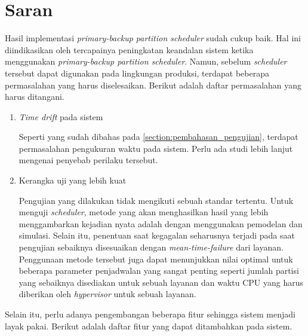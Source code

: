 \section{Saran}

Hasil implementasi \textit{primary-backup partition scheduler} sudah cukup baik. Hal ini
diindikasikan oleh tercapainya peningkatan keandalan sistem ketika menggunakan
\textit{primary-backup partition scheduler}. Namun, sebelum \textit{scheduler} tersebut dapat
digunakan pada lingkungan produksi, terdapat beberapa permasalahan yang harus diselesaikan.
Berikut adalah daftar permasalahan yang harus ditangani.

\begin{enumerate}

	\item \textit{Time drift} pada sistem

		Seperti yang sudah dibahas pada \autoref{section:pembahasan_pengujian}, terdapat
		permasalahan pengukuran waktu pada sistem. Perlu ada studi lebih lanjut mengenai
		penyebab perilaku tersebut.

	\item Kerangka uji yang lebih kuat

		Pengujian yang dilakukan tidak mengikuti sebuah standar tertentu. Untuk menguji
		\textit{scheduler}, metode yang akan menghasilkan hasil yang lebih menggambarkan
		kejadian nyata adalah dengan menggunakan pemodelan dan simulasi. Selain itu,
		penentuan saat kegagalan seharusnya terjadi pada saat pengujian sebaiknya
		disesuaikan dengan \textit{mean-time-failure} dari layanan. Penggunaan metode
		tersebut juga dapat menunjukkan nilai optimal untuk beberapa parameter
		penjadwalan yang sangat penting seperti jumlah partisi yang sebaiknya disediakan
		untuk sebuah layanan dan waktu CPU yang harus diberikan oleh \textit{hypervisor}
		untuk sebuah layanan.

\end{enumerate}

Selain itu, perlu adanya pengembangan beberapa fitur sehingga sistem menjadi layak pakai.
Berikut adalah daftar fitur yang dapat ditambahkan pada sistem.

